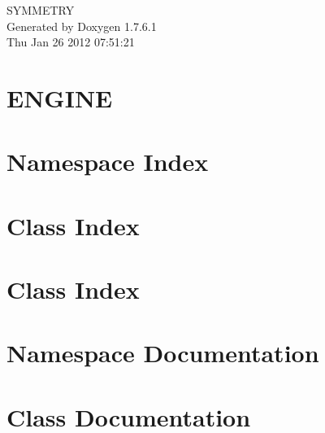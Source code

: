 \documentclass[a4paper]{book}
\begin{document}
\hypersetup{pageanchor=false,citecolor=blue}
\begin{titlepage}
\vspace*{7cm}
\begin{center}
{\Large \-S\-Y\-M\-M\-E\-T\-R\-Y }\\
\vspace*{1cm}
{\large \-Generated by Doxygen 1.7.6.1}\\
\vspace*{0.5cm}
{\small Thu Jan 26 2012 07:51:21}\\
\end{center}
\end{titlepage}
\clearemptydoublepage
{}
\tableofcontents
\clearemptydoublepage
{}
\hypersetup{pageanchor=true,citecolor=blue}
\chapter{\-E\-N\-G\-I\-N\-E}
\label{index}\hypertarget{index}{}
\chapter{\-Namespace \-Index}

\chapter{\-Class \-Index}

\chapter{\-Class \-Index}

\chapter{\-Namespace \-Documentation}

\chapter{\-Class \-Documentation}



















\printindex
\end{document}
